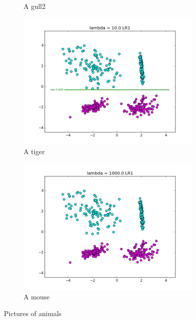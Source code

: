 \documentclass[10pt,twoside]{article}
\begin{document}
\begin{figure}[h]
\begin{subfigure}[b]{0.25\textwidth}
                \caption{A gull2}
                \label{fig:gull2}
        \end{subfigure}%
        \begin{subfigure}[b]{0.25\textwidth}
                \centering
                \includegraphics[width=\linewidth]{Figures/P1/LR1_10.png}
                \caption{A tiger}
                \label{fig:tiger}
        \end{subfigure}%
        \begin{subfigure}[b]{0.25\textwidth}
                \centering
                \includegraphics[width=\linewidth]{Figures/P1/LR1_1000.png}
                \caption{A mouse}
                \label{fig:mouse}
        \end{subfigure}
        \caption{Pictures of animals}\label{fig:animals}
\end{figure}
\end{document}
